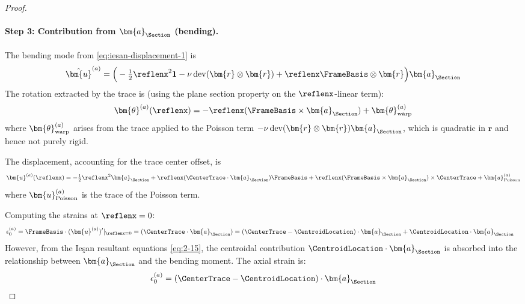\begin{proof}
\paragraph{Step 3: Contribution from $\bm{a}_{\Section}$ (bending).}
The bending mode from \eqref{eq:iesan-displacement-1} is
\begin{equation*}
\hat{\bm{u}}^{(a)} = \Big( -\tfrac{1}{2}\reflenx^2 \mathbf{1} - \nu \operatorname{dev}(\bm{r} \otimes \bm{r}) 
+ \reflenx \FrameBasis \otimes \bm{r} \Big) \bm{a}_{\Section}
\end{equation*}
The rotation extracted by the trace is (using the plane section property on 
the $\reflenx$-linear term):
\begin{equation*}
\bm{\theta}^{(a)}(\reflenx) = -\reflenx (\FrameBasis \times \bm{a}_{\Section}) 
+ \bm{\theta}^{(a)}_{\rm warp}
\end{equation*}
where $\bm{\theta}^{(a)}_{\rm warp}$ arises from the trace applied to the 
Poisson term $-\nu \operatorname{dev}(\bm{r} \otimes \bm{r}) \bm{a}_{\Section}$, 
which is quadratic in $\bm{r}$ and hence not purely rigid.

The displacement, accounting for the trace center offset, is
\begin{equation*}
\bm{u}^{(a)}(\reflenx) = -\tfrac{1}{2}\reflenx^2 \bm{a}_{\Section} 
+ \reflenx (\CenterTrace \cdot \bm{a}_{\Section}) \FrameBasis 
+ \reflenx (\FrameBasis \times \bm{a}_{\Section}) \times \CenterTrace 
+ \bm{u}^{(a)}_{\rm Poisson}
\end{equation*}
where $\bm{u}^{(a)}_{\rm Poisson}$ is the trace of the Poisson term.

Computing the strains at $\reflenx = 0$:
\begin{align*}
\epsilon_{0}^{(a)} &= \FrameBasis \cdot (\bm{u}^{(a)})'|_{\reflenx=0} 
= (\CenterTrace \cdot \bm{a}_{\Section}) 
= (\CenterTrace - \CentroidLocation) \cdot \bm{a}_{\Section} + \CentroidLocation \cdot \bm{a}_{\Section}
\end{align*}
However, from the Ieşan resultant equations \eqref{eq:2-15}, the centroidal 
contribution $\CentroidLocation \cdot \bm{a}_{\Section}$ is absorbed into the 
relationship between $\bm{a}_{\Section}$ and the bending moment. 
The axial strain is:
\begin{equation*}
\epsilon_{0}^{(a)} = (\CenterTrace - \CentroidLocation) \cdot \bm{a}_{\Section}
\end{equation*}


\end{proof}
